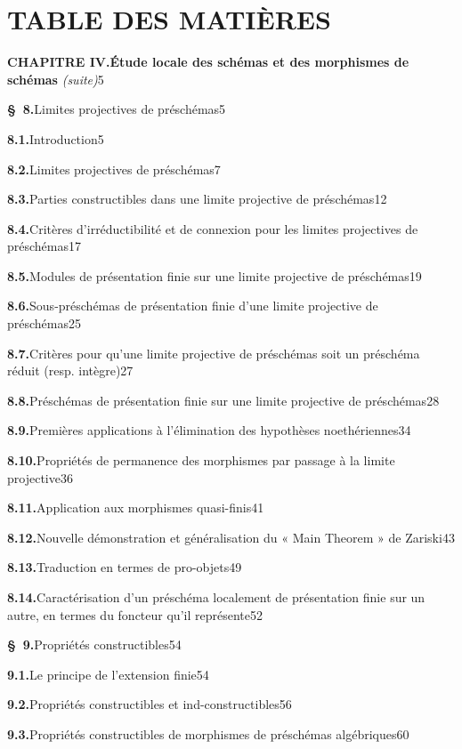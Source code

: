 \let\EGAIVthreeTerm\relax
\endgroup

\clearpage
\thispagestyle{empty}
\null

\clearpage
{}
{}
\section*{TABLE DES MATIÈRES}

\begingroup
\small
\setlength{\parindent}{0pt}
\setlength{\parskip}{1.5pt}
\newcommand{\EGAIVthreeContentsLine}[3]{\textbf{#1}\quad #2\unskip\nobreak\hspace{0.4em}\nobreak\dotfill\nobreak\mbox{#3}\par}

\EGAIVthreeContentsLine{CHAPITRE IV.}{\textbf{Étude locale des schémas et des morphismes de schémas} \emph{(suite)}}{5}
\EGAIVthreeContentsLine{\S~8.}{Limites projectives de préschémas}{5}
\EGAIVthreeContentsLine{8.1.}{Introduction}{5}
\EGAIVthreeContentsLine{8.2.}{Limites projectives de préschémas}{7}
\EGAIVthreeContentsLine{8.3.}{Parties constructibles dans une limite projective de préschémas}{12}
\EGAIVthreeContentsLine{8.4.}{Critères d'irréductibilité et de connexion pour les limites projectives de préschémas}{17}
\EGAIVthreeContentsLine{8.5.}{Modules de présentation finie sur une limite projective de préschémas}{19}
\EGAIVthreeContentsLine{8.6.}{Sous-préschémas de présentation finie d'une limite projective de préschémas}{25}
\EGAIVthreeContentsLine{8.7.}{Critères pour qu'une limite projective de préschémas soit un préschéma réduit (resp. intègre)}{27}
\EGAIVthreeContentsLine{8.8.}{Préschémas de présentation finie sur une limite projective de préschémas}{28}
\EGAIVthreeContentsLine{8.9.}{Premières applications à l'élimination des hypothèses noethériennes}{34}
\EGAIVthreeContentsLine{8.10.}{Propriétés de permanence des morphismes par passage à la limite projective}{36}
\EGAIVthreeContentsLine{8.11.}{Application aux morphismes quasi-finis}{41}
\EGAIVthreeContentsLine{8.12.}{Nouvelle démonstration et généralisation du « Main Theorem » de Zariski}{43}
\EGAIVthreeContentsLine{8.13.}{Traduction en termes de pro-objets}{49}
\EGAIVthreeContentsLine{8.14.}{Caractérisation d'un préschéma localement de présentation finie sur un autre, en termes du foncteur qu'il représente}{52}

\EGAIVthreeContentsLine{\S~9.}{Propriétés constructibles}{54}
\EGAIVthreeContentsLine{9.1.}{Le principe de l'extension finie}{54}
\EGAIVthreeContentsLine{9.2.}{Propriétés constructibles et ind-constructibles}{56}
\EGAIVthreeContentsLine{9.3.}{Propriétés constructibles de morphismes de préschémas algébriques}{60}

